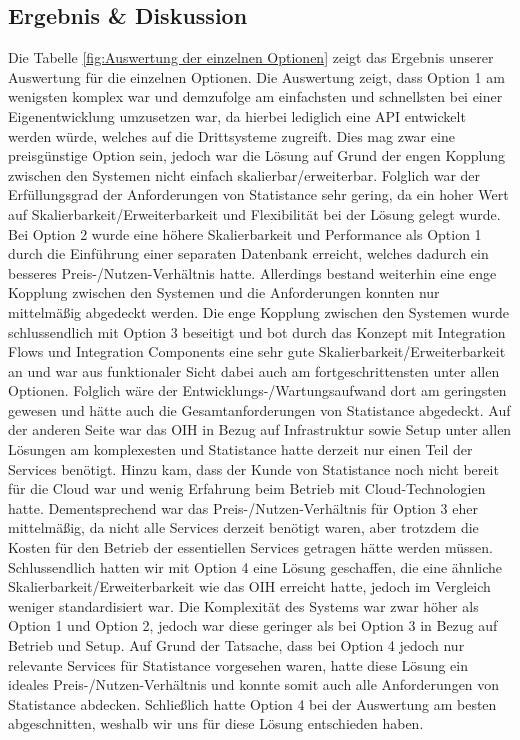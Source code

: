 \subsection*{\textbf{Ergebnis \& Diskussion}}\label{Ergebnis & Diskussion} 
Die Tabelle \ref{fig:Auswertung der einzelnen Optionen} zeigt das Ergebnis unserer Auswertung für die einzelnen Optionen. Die Auswertung zeigt, dass Option 1 am wenigsten komplex war und demzufolge am einfachsten und schnellsten bei einer Eigenentwicklung umzusetzen war, da hierbei lediglich eine API entwickelt werden würde, welches auf die Drittsysteme zugreift. Dies mag zwar eine preisgünstige Option sein, jedoch war die Lösung auf Grund der engen Kopplung zwischen den Systemen nicht einfach skalierbar/erweiterbar. Folglich war der Erfüllungsgrad der Anforderungen von Statistance sehr gering, da ein hoher Wert auf Skalierbarkeit/Erweiterbarkeit und Flexibilität bei der Lösung gelegt wurde. Bei Option 2 wurde eine höhere Skalierbarkeit und Performance als Option 1 durch die Einführung einer separaten Datenbank erreicht, welches dadurch ein besseres Preis-/Nutzen-Verhältnis hatte.  Allerdings bestand weiterhin eine enge Kopplung zwischen den Systemen und die Anforderungen konnten nur mittelmäßig abgedeckt werden. Die enge Kopplung zwischen den Systemen wurde schlussendlich mit Option 3 beseitigt und bot durch das Konzept mit Integration Flows und Integration Components eine sehr gute Skalierbarkeit/Erweiterbarkeit an und war aus funktionaler Sicht dabei auch am fortgeschrittensten unter allen Optionen. Folglich wäre der Entwicklungs-/Wartungsaufwand dort am geringsten gewesen und hätte auch die Gesamtanforderungen von Statistance abgedeckt. Auf der anderen Seite war das OIH in Bezug auf Infrastruktur sowie Setup unter allen Lösungen am komplexesten und Statistance hatte derzeit nur einen Teil der Services benötigt. Hinzu kam, dass der Kunde von Statistance noch nicht bereit für die Cloud war und wenig Erfahrung beim Betrieb mit Cloud-Technologien hatte. Dementsprechend war das Preis-/Nutzen-Verhältnis für Option 3 eher mittelmäßig, da nicht alle Services derzeit benötigt waren, aber trotzdem die Kosten für den Betrieb der essentiellen Services getragen hätte werden müssen. Schlussendlich hatten wir mit Option 4 eine Lösung geschaffen, die eine ähnliche Skalierbarkeit/Erweiterbarkeit wie das OIH erreicht hatte, jedoch im Vergleich weniger standardisiert war. Die Komplexität des Systems war zwar höher als Option 1 und Option 2, jedoch war diese geringer als bei Option 3 in Bezug auf Betrieb und Setup. Auf Grund der Tatsache, dass bei Option 4 jedoch nur relevante Services für Statistance vorgesehen waren, hatte diese Lösung ein ideales Preis-/Nutzen-Verhältnis und konnte somit auch alle Anforderungen von Statistance abdecken. Schließlich hatte Option 4 bei der Auswertung am besten abgeschnitten, weshalb wir uns für diese Lösung entschieden haben. 

